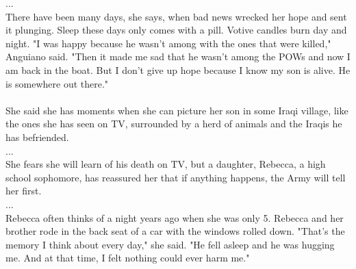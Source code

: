 \documentclass[a4paper]{article}
\begin{document}
...\\
There have been many days, she says, when bad news wrecked her hope and sent it plunging. Sleep these days only comes with a pill. Votive candles burn day and night.  "I was happy because he wasn't among with the ones that were killed," Anguiano said. "Then it made me sad that he wasn't among the POWs and now I am back in the boat. But I don't give up hope because I know my son is alive. He is somewhere out there."\\
\\
She said she has moments when she can picture her son in some Iraqi village, like the ones she has seen on TV, surrounded by a herd of animals and the Iraqis he has befriended.\\
...\\
She fears she will learn of his death on TV, but a daughter, Rebecca, a high school sophomore, has reassured her that if anything happens, the Army will tell her first.\\
...\\
Rebecca often thinks of a night years ago when she was only 5. Rebecca and her brother rode in the back seat of a car with the windows rolled down.  "That's the memory I think about every day," she said. "He fell asleep and he was hugging me. And at that time, I felt nothing could ever harm me."\\
\end{document}
